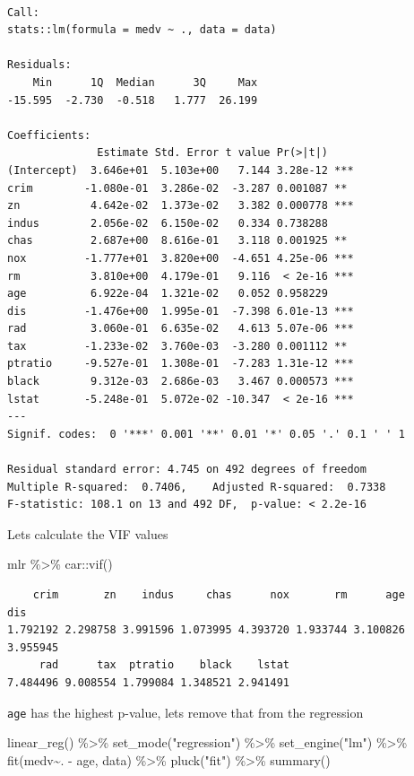 \documentclass[
  letterpaper,
  DIV=11,
  numbers=noendperiod]{scrreprt}
\newenvironment{Shaded}{\begin{snugshade}}{\end{snugshade}}
\newcommand{\FunctionTok}[1]{\textcolor[rgb]{0.02,0.16,0.49}{#1}}
\newcommand{\NormalTok}[1]{\textcolor[rgb]{0.33,0.33,0.33}{#1}}
\newcommand{\SpecialCharTok}[1]{\textcolor[rgb]{0.00,0.46,0.62}{#1}}
\newcommand{\StringTok}[1]{\textcolor[rgb]{0.00,0.50,0.00}{#1}}
\begin{document}
\begin{verbatim}

Call:
stats::lm(formula = medv ~ ., data = data)

Residuals:
    Min      1Q  Median      3Q     Max 
-15.595  -2.730  -0.518   1.777  26.199 

Coefficients:
              Estimate Std. Error t value Pr(>|t|)    
(Intercept)  3.646e+01  5.103e+00   7.144 3.28e-12 ***
crim        -1.080e-01  3.286e-02  -3.287 0.001087 ** 
zn           4.642e-02  1.373e-02   3.382 0.000778 ***
indus        2.056e-02  6.150e-02   0.334 0.738288    
chas         2.687e+00  8.616e-01   3.118 0.001925 ** 
nox         -1.777e+01  3.820e+00  -4.651 4.25e-06 ***
rm           3.810e+00  4.179e-01   9.116  < 2e-16 ***
age          6.922e-04  1.321e-02   0.052 0.958229    
dis         -1.476e+00  1.995e-01  -7.398 6.01e-13 ***
rad          3.060e-01  6.635e-02   4.613 5.07e-06 ***
tax         -1.233e-02  3.760e-03  -3.280 0.001112 ** 
ptratio     -9.527e-01  1.308e-01  -7.283 1.31e-12 ***
black        9.312e-03  2.686e-03   3.467 0.000573 ***
lstat       -5.248e-01  5.072e-02 -10.347  < 2e-16 ***
---
Signif. codes:  0 '***' 0.001 '**' 0.01 '*' 0.05 '.' 0.1 ' ' 1

Residual standard error: 4.745 on 492 degrees of freedom
Multiple R-squared:  0.7406,    Adjusted R-squared:  0.7338 
F-statistic: 108.1 on 13 and 492 DF,  p-value: < 2.2e-16
\end{verbatim}

Lets calculate the VIF values

\begin{Shaded}
\begin{Highlighting}[]
\NormalTok{mlr }\SpecialCharTok{\%\textgreater{}\%}\NormalTok{ car}\SpecialCharTok{::}\FunctionTok{vif}\NormalTok{()}
\end{Highlighting}
\end{Shaded}

\begin{verbatim}
    crim       zn    indus     chas      nox       rm      age      dis 
1.792192 2.298758 3.991596 1.073995 4.393720 1.933744 3.100826 3.955945 
     rad      tax  ptratio    black    lstat 
7.484496 9.008554 1.799084 1.348521 2.941491 
\end{verbatim}

\texttt{age} has the highest p-value, lets remove that from the
regression

\begin{Shaded}
\begin{Highlighting}[]
\FunctionTok{linear\_reg}\NormalTok{() }\SpecialCharTok{\%\textgreater{}\%} 
  \FunctionTok{set\_mode}\NormalTok{(}\StringTok{"regression"}\NormalTok{) }\SpecialCharTok{\%\textgreater{}\%} 
  \FunctionTok{set\_engine}\NormalTok{(}\StringTok{"lm"}\NormalTok{) }\SpecialCharTok{\%\textgreater{}\%} 
  \FunctionTok{fit}\NormalTok{(medv}\SpecialCharTok{\textasciitilde{}}\NormalTok{. }\SpecialCharTok{{-}}\NormalTok{ age, data) }\SpecialCharTok{\%\textgreater{}\%} 
  \FunctionTok{pluck}\NormalTok{(}\StringTok{"fit"}\NormalTok{) }\SpecialCharTok{\%\textgreater{}\%} 
  \FunctionTok{summary}\NormalTok{()}
\end{Highlighting}
\end{Shaded}
\end{document}
